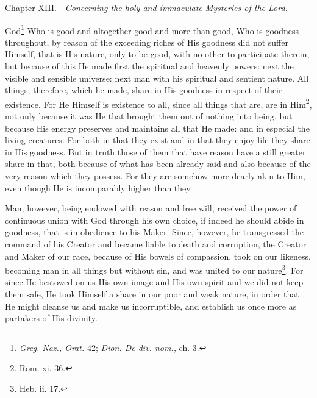 
Chapter XIII.—\emph{Concerning the holy and immaculate Mysteries of the Lord.}

God\footnote{\emph{Greg. Naz., Orat. }42; \emph{Dion. De div. nom., }ch. 3.} Who is good and altogether good and more than good, Who is goodness throughout, by reason of the exceeding riches of His goodness did not suffer Himself, that is His nature, only to be good, with no other to participate therein, but because of this He made first the spiritual and heavenly powers: next the visible and sensible universe: next man with his spiritual and sentient nature. All things, therefore, which he made, share in His goodness in respect of their existence. For He Himself is existence to all, since all things that are, are in Him\footnote{Rom. xi. 36.}, not only because it was He that brought them out of nothing into being, but because His energy preserves and maintains all that He made: and in especial the living creatures. For both in that they exist and in that they enjoy life they share in His goodness. But in truth those of them that have reason have a still greater share in that, both because of what has been already said and also because of the very reason which they possess. For they are somehow more dearly akin to Him, even though He is incomparably higher than they.

Man, however, being endowed with reason and free will, received the power of continuous union with God through his own choice, if indeed he should abide in goodness, that is in obedience to his Maker. Since, however, he transgressed the command of his Creator and became liable to death and corruption, the Creator and Maker of our race, because of His bowels of compassion, took on our likeness, becoming man in all things but without sin, and was united to our nature\footnote{Heb. ii. 17.}. For since He bestowed on us His own image and His own spirit and we did not keep them safe, He took Himself a share in our poor and weak nature, in order that He might cleanse us and make us incorruptible, and establish us once more as partakers of His divinity.


